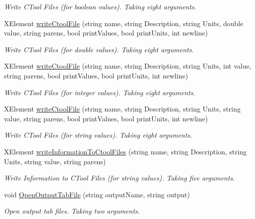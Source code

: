 \begin{DoxyCompactItemize}
\begin{DoxyCompactList}\small\item\em Write C\+Tool Files (for boolean values). Taking eight arguments. \end{DoxyCompactList}\item 
X\+Element \mbox{\hyperlink{class_global_vars_aa720cc77138c1f6f718b12427e93c49b}{write\+Ctool\+File}} (string name, string Description, string Units, double value, string parens, bool print\+Values, bool print\+Units, int newline)
\begin{DoxyCompactList}\small\item\em Write C\+Tool Files (for double values). Taking eight arguments. \end{DoxyCompactList}\item 
X\+Element \mbox{\hyperlink{class_global_vars_ad853728ce5c4ee755db932b2540f891a}{write\+Ctool\+File}} (string name, string Description, string Units, int value, string parens, bool print\+Values, bool print\+Units, int newline)
\begin{DoxyCompactList}\small\item\em Write C\+Tool Files (for integer values). Taking eight arguments. \end{DoxyCompactList}\item 
X\+Element \mbox{\hyperlink{class_global_vars_ad264d59699bea4f96edb551127af1ee7}{write\+Ctool\+File}} (string name, string Description, string Units, string value, string parens, bool print\+Values, bool print\+Units, int newline)
\begin{DoxyCompactList}\small\item\em Write C\+Tool Files (for string values). Taking eight arguments. \end{DoxyCompactList}\item 
X\+Element \mbox{\hyperlink{class_global_vars_a5e013533bac30e586a336ceddaf16e43}{write\+Information\+To\+Ctool\+Files}} (string name, string Description, string Units, string value, string parens)
\begin{DoxyCompactList}\small\item\em Write Information to C\+Tool Files (for string values). Taking five arguments. \end{DoxyCompactList}\item 
void \mbox{\hyperlink{class_global_vars_a3d95bee07269860dc17a738aa02722f1}{Open\+Output\+Tab\+File}} (string output\+Name, string output)
\begin{DoxyCompactList}\small\item\em Open output tab files. Taking two arguments. \end{DoxyCompactList}\item 

\end{DoxyCompactItemize}
